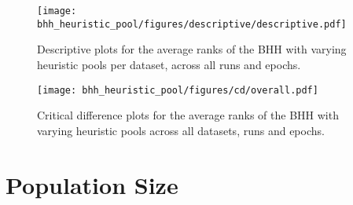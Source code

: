 \begin{figure}[htbp]
	\centering
	\texttt{[image: bhh\_heuristic\_pool/figures/descriptive/descriptive.pdf]}
	\caption{Descriptive plots for the average ranks of the \acs{BHH} with varying heuristic pools per dataset, across all runs and epochs.}
	\label{fig:results:heuristic_pool:descriptive:descriptive}
\end{figure}

\begin{figure}[htbp]
	\centering
	\texttt{[image: bhh\_heuristic\_pool/figures/cd/overall.pdf]}
	\caption{Critical difference plots for the average ranks of the \acs{BHH} with varying heuristic pools across all datasets, runs and epochs.}
	\label{fig:results:heuristic_pool:descriptive:cd}
\end{figure}



\section{Population Size}\label{sec:results:bhh_variant_population}

